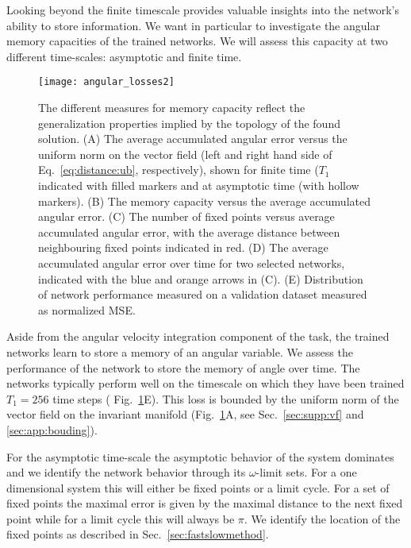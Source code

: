 \documentclass{article} %
\newcounter{ct}
\theoremstyle{definition}
\theoremstyle{remark}
\begin{document}
Looking beyond the finite timescale provides valuable insights into the network's ability to store information.
We want in particular to investigate the angular memory capacities of the trained networks.
We will assess this capacity at two different time-scales:  asymptotic and finite time.


\begin{figure}[tbhp]
  \centering
  \texttt{[image: angular\_losses2]}
  \caption{The different measures for memory capacity reflect the generalization properties implied by the topology of the found solution.
  (A) The average accumulated angular error versus the uniform norm on the vector field (left and right hand side of Eq.~\ref{eq:distance:ub}, respectively), shown for finite time ($T_1$ indicated with filled markers and at asymptotic time (with hollow markers).
  (B) The memory capacity versus the average accumulated angular error.
  (C) The number of fixed points versus average accumulated angular error, with the average distance between neighbouring fixed points indicated in red.
  (D) The  average accumulated angular error over time for two selected networks, indicated with the blue and orange arrows in (C).
  (E) Distribution of network performance measured on a validation dataset measured as normalized MSE.
  }
  \label{fig:angular_loss}
\end{figure}

Aside from the angular velocity integration component of the task, the trained networks learn to store a memory of an angular variable.
We assess the performance of the network to store the memory of angle over time.
The networks typically perform well on the timescale on which they have been trained $T_1=256$ time steps ( Fig.~\ref{fig:angular_loss}E).
%
This loss is bounded by the uniform norm of the vector field  on the invariant manifold (Fig.~\ref{fig:angular_loss}A,  see Sec.~\ref{sec:supp:vf} and \ref{sec:app:bouding}).

For the asymptotic time-scale the asymptotic behavior of the system dominates and we identify the network behavior through its $\omega$-limit sets.
For a one dimensional system this will either be fixed points or a limit cycle.
For a set of fixed points the maximal error is given by the maximal distance to the next fixed point while for a limit cycle this will always be $\pi$.
We identify the location of the fixed points as described in Sec.~\ref{sec:fastslowmethod}.
\end{document}
